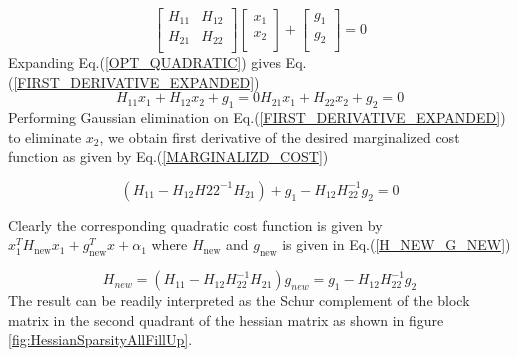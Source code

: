 \begin{equation}
	\begin{bmatrix} 
				H_{11} & H_{12} \\
				H_{21} & H_{22} \\
	\end{bmatrix}
	\begin{bmatrix} 
				x_{1} \\
				x_{2} \\
	\end{bmatrix} + 
	\begin{bmatrix} 
				g_{1} \\
				g_{2} \\
	\end{bmatrix} = 0
	\label{OPT_QUADRATIC}
\end{equation}
Expanding Eq.(\ref{OPT_QUADRATIC}) gives Eq.(\ref{FIRST_DERIVATIVE_EXPANDED})
\begin{subequations}
	\begin{equation}
		H_{11}x_1 + H_{12}x_2 + g_1 = 0
	\end{equation}
	\begin{equation}
		H_{21}x_1 + H_{22}x_2 + g_2 = 0
	\end{equation}
\label{FIRST_DERIVATIVE_EXPANDED}
\end{subequations}
Performing Gaussian elimination on Eq.(\ref{FIRST_DERIVATIVE_EXPANDED}) to eliminate $x_2$, we obtain first derivative of the desired marginalized cost function as given by Eq.(\ref{MARGINALIZD_COST})

\begin{equation}
	\left(H_{11} - H_{12}H{22}^{-1}H_{21}\right) + g_1 - H_{12}H_{22}^{-1}g_2 = 0
\label{MARGINALIZD_COST}
\end{equation}

Clearly the corresponding quadratic cost function is given by $x_1^TH_\mathrm{new}x_1 + g_\mathrm{new}^Tx + \alpha_1$ where $H_\mathrm{new}$ and $g_\mathrm{new}$ is given in Eq.(\ref{H_NEW_G_NEW})

\begin{subequations}
	\begin{equation}
		H_{new} = \left(H_{11} - H_{12}H_{22}^{-1}H_{21}\right)
	\end{equation}

	\begin{equation}
		g_{new} = g_1 - H_{12}H_{22}^{-1}g_2
	\end{equation}
	\label{H_NEW_G_NEW}
\end{subequations}
The result can be readily interpreted as the Schur complement of the block matrix in the second quadrant of the hessian matrix as shown in figure \ref{fig:HessianSparsityAllFillUp}.

